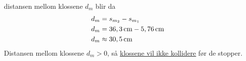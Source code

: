 \documentclass{article}
\begin{document}
distansen mellom klossene \(d_m\) blir da
\begin{equation*}
\begin{split}
    d_m &= s_{m_2} - s_{m_1} \\
    d_m &= \unit[36,3]{cm} - \unit[5,76]{cm} \\
    d_m &\approx \unit[30,5]{cm}
\end{split}
\end{equation*}
Distansen mellom klossene \(d_m > 0\), så \underline{\underline{klossene vil ikke kollidere}} før de stopper.
\end{document}
